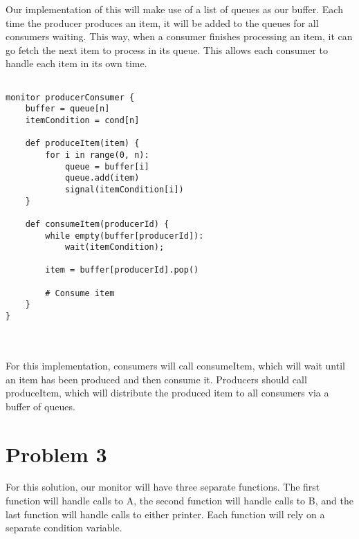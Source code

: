 \documentclass{article}%
\begin{document}
Our implementation of this will make use of a list of queues as our buffer. Each time the producer produces an item, it will be added to the queues for all
consumers waiting. This way, when a consumer finishes processing an item, it can go fetch the next item to process in its queue. This allows each consumer
to handle each item in its own time.
\begin{lstlisting}[frame=single]

monitor producerConsumer {
    buffer = queue[n]
    itemCondition = cond[n]

    def produceItem(item) {
        for i in range(0, n):
            queue = buffer[i]
            queue.add(item)
            signal(itemCondition[i])
    }

    def consumeItem(producerId) {
        while empty(buffer[producerId]):
            wait(itemCondition);

        item = buffer[producerId].pop()

        # Consume item
    }
}

\end{lstlisting}\\
\\
For this implementation, consumers will call consumeItem, which will wait until an item has been produced and then consume it. Producers should call
produceItem, which will distribute the produced item to all consumers via a buffer of queues.


\section*{Problem 3}

For this solution, our monitor will have three separate functions. The first function will handle calls to A, the second function will handle calls to B, and the
last function will handle calls to either printer. Each function will rely on a separate condition variable.
\end{document}
